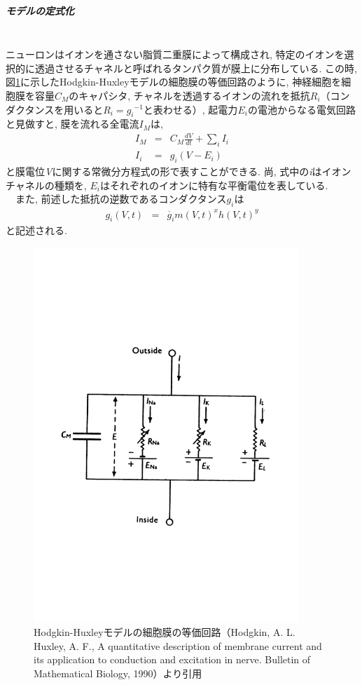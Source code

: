 \subparagraph{モデルの定式化}~\\
\label{subpar-hh-model}
ニューロンはイオンを通さない脂質二重膜によって構成され, 特定のイオンを選択的に透過させるチャネルと呼ばれるタンパク質が膜上に分布している.
この時, 図\ref{fig:hh-circuit}に示したHodgkin-Huxleyモデルの細胞膜の等価回路のように,
神経細胞を細胞膜を容量$C_M$のキャパシタ, チャネルを透過するイオンの流れを抵抗$R_i$（コンダクタンスを用いると$R_i = {g_i}^{-1}$と表わせる）, 起電力$E_i$の電池からなる電気回路と見做すと, 膜を流れる全電流$I_M$は,
\begin{eqnarray}
  I_M & = & C_M\frac{dV}{dt} + \sum_{i} I_i\\
  I_i & = & g_i (V - E_i)
\end{eqnarray}
と膜電位{\it V}に関する常微分方程式の形で表すことができる. 尚, 式中の{\it i}はイオンチャネルの種類を, $E_i$はそれぞれのイオンに特有な平衡電位を表している.\\
　また, 前述した抵抗の逆数であるコンダクタンス$g_i$は
\begin{eqnarray}
  g_i(V, t) & = &\overline{g}_im(V, t)^xh(V,t)^y
\end{eqnarray}
と記述される.\\
\clearpage
\begin{figure}[htb]
 \begin{center}
    \includegraphics[width=10cm]{./images/hh-circuit.pdf}
    \caption[Hodgkin-Huxleyモデルの細胞膜の等価回路]{Hodgkin-Huxleyモデルの細胞膜の等価回路（Hodgkin, A. L.
Huxley, A. F., A quantitative description of membrane current and its application to conduction and excitation in nerve. Bulletin of Mathematical Biology, 1990\cite{hh}）より引用}
    \label{fig:hh-circuit}
 \end{center}
\end{figure}

